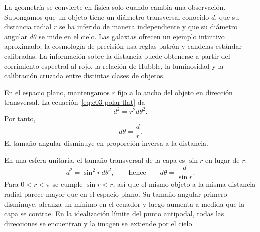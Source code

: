 La geometría se convierte en física solo cuando cambia una observación. Supongamos que un objeto tiene un diámetro transversal conocido \(d\), que su distancia radial \(r\) se ha inferido de manera independiente y que su diámetro angular \(d\theta\) se mide en el cielo. Las galaxias ofrecen un ejemplo intuitivo aproximado; la cosmología de precisión usa reglas patrón y candelas estándar calibradas. La información sobre la distancia puede obtenerse a partir del corrimiento espectral al rojo, la relación de Hubble, la luminosidad y la calibración cruzada entre distintas clases de objetos.

En el espacio plano, mantengamos \(r\) fijo a lo ancho del objeto en dirección transversal. La ecuación~\eqref{eq:c03-polar-flat} da
\begin{equation}
d^2 = r^2 d\theta^2.
\label{eq:c03-flat-angle-step}
\end{equation}
Por tanto,
\begin{equation}
d\theta = \frac{d}{r}.
\label{eq:c03-flat-angle}
\end{equation}
El tamaño angular disminuye en proporción inversa a la distancia.

En una esfera unitaria, el tamaño transversal de la capa es \(\sin r\) en lugar de \(r\):
\begin{equation}
d^2 = \sin^2 r\, d\theta^2,
\qquad\text{hence}\qquad
d\theta = \frac{d}{\sin r}.
\label{eq:c03-spherical-angle}
\end{equation}
Para \(0<r<\pi\) se cumple \(\sin r<r\), así que el mismo objeto a la misma distancia radial parece mayor que en el espacio plano. Su tamaño angular primero disminuye, alcanza un mínimo en el ecuador y luego aumenta a medida que la capa se contrae. En la idealización límite del punto antipodal, todas las direcciones se encuentran y la imagen se extiende por el cielo.

\begin{classroomqa}\end{classroomqa}

